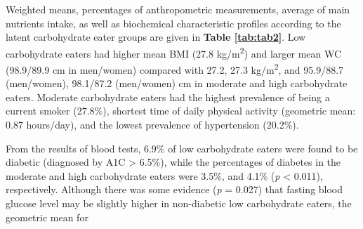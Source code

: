 Weighted means, percentages of anthropometric measurements, average of main nutrients intake, as well as biochemical characteristic profiles according to the latent carbohydrate eater groups are given in \textbf{Table \ref{tab:tab2}}. Low carbohydrate eaters had higher mean BMI (27.8 kg/m\textsuperscript{2}) and larger mean WC (98.9/89.9 cm in men/women) compared with 27.2, 27.3 kg/m\textsuperscript{2}, and 95.9/88.7 (men/women), 98.1/87.2 (men/women) cm in moderate and high carbohydrate eaters. Moderate carbohydrate eaters had the highest prevalence of being a current smoker (27.8\%), shortest time of daily physical activity (geometric mean: 0.87 hours/day), and the lowest prevalence of hypertension (20.2\%).

From the results of blood tests, 6.9\% of low carbohydrate eaters were found to be diabetic (diagnosed by A1C > 6.5\%), while the percentages of diabetes in the moderate and high carbohydrate eaters were 3.5\%, and 4.1\% (\textit{p} < 0.011), respectively. Although there was some evidence (\textit{p} = 0.027) that fasting blood glucose level may be slightly higher in non-diabetic low carbohydrate eaters, the geometric mean for



